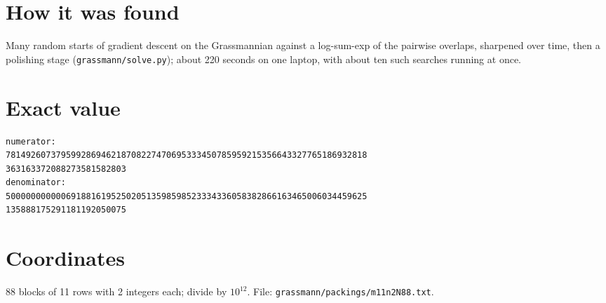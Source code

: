 \documentclass[11pt,a4paper]{article}
\begin{document}
\section{How it was found}
Many random starts of gradient descent on the Grassmannian against a log-sum-exp of the pairwise overlaps, sharpened over time, then a polishing stage (\texttt{grassmann/solve.py}); about 220 seconds on one laptop, with about ten such searches running at once.


\appendix
\section{Exact value}
{\small
\begin{verbatim}
numerator:
781492607379599286946218708227470695333450785959215356643327765186932818
363163372088273581582803
denominator:
500000000000691881619525020513598598523334336058382866163465006034459625
135888175291181192050075
\end{verbatim}}

\section{Coordinates}
88 blocks of 11 rows with 2 integers each; divide by $10^{12}$. File: \texttt{grassmann/packings/m11n2N88.txt}.
{\tiny
\begin{multicols}{4}
\end{multicols}}
\end{document}
